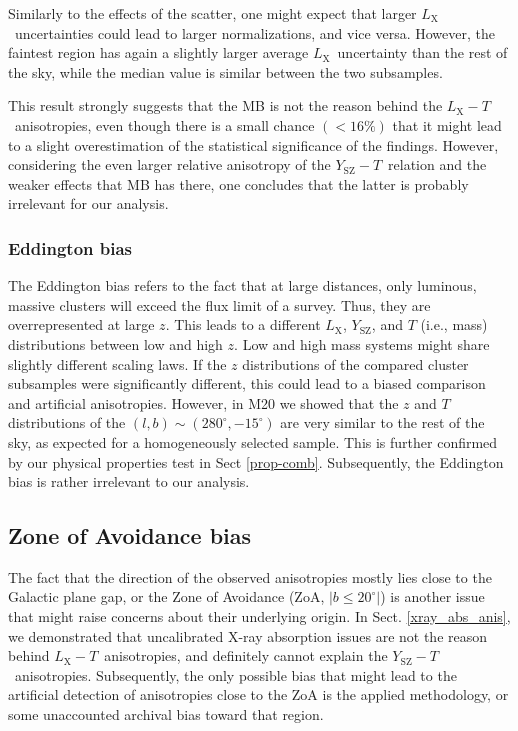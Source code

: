 \documentclass{aa}   %
\newcommand{\LT}{$L_{\text{X}}-T$}
\newcommand{\YT}{$Y_{\text{SZ}}-T$}
\newcommand{\Lx}{$L_{\text{X}}$}
\newcommand{\Ysz}{$Y_{\text{SZ}}$}
\begin{document}
Similarly to the effects of the scatter, one might expect that larger \Lx\ uncertainties could lead to larger normalizations, and vice versa. However, the faintest region has again a slightly larger average \Lx\ uncertainty than the rest of the sky, while the median value is similar between the two subsamples.

This result strongly suggests that the MB is not the reason behind the \LT\ anisotropies, even though there is a small chance $(<16\%)$ that it might lead to a slight overestimation of the statistical significance of the findings. However, considering the even larger relative anisotropy of the \YT\ relation and the weaker effects that MB has there, one concludes that the latter is probably irrelevant for our analysis.

\subsubsection{Eddington bias}

The Eddington bias refers to the fact that at large distances, only luminous, massive clusters will exceed the flux limit of a survey. Thus, they are overrepresented at large $z$. This leads to a different \Lx, \Ysz, and $T$  (i.e., mass) distributions between low and high $z$. Low and high mass systems might share slightly different scaling laws. If the $z$ distributions of the compared cluster subsamples were significantly different, this could lead to a biased comparison and artificial anisotropies. However, in M20 we showed that the $z$ and $T$ distributions of the $(l,b)\sim (280^{\circ}, -15^{\circ})$ are very similar to the rest of the sky, as expected for a homogeneously selected sample. This is further confirmed by our physical properties test in Sect \ref{prop-comb}. Subsequently, the Eddington bias is rather irrelevant to our analysis. 

\subsection{Zone of Avoidance bias}\label{zoa-sect}

The fact that the direction of the observed anisotropies mostly lies close to the Galactic plane gap, or the Zone of Avoidance (ZoA, $|b\leq 20^{\circ}|$) is another issue that might raise concerns about their underlying origin. In Sect. \ref{xray_abs_anis}, we demonstrated that uncalibrated X-ray absorption issues are not the reason behind \LT\ anisotropies, and definitely cannot explain the \YT\ anisotropies. Subsequently, the only possible bias that might lead to the artificial detection of anisotropies close to the ZoA is the applied methodology, or some unaccounted archival bias toward that region. 
\end{document}
